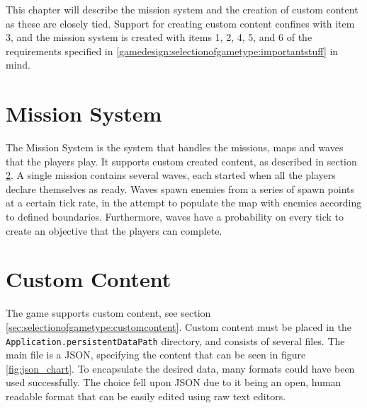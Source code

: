 This chapter will describe the mission system and the creation of custom content as these are closely tied.
Support for creating custom content confines with item 3, and the mission system is created with items 1, 2, 4, 5, and 6 of the requirements specified in \ref{gamedesign:selectionofgametype:importantstuff} in mind.

\section{Mission System}

The Mission System is the system that handles the missions, maps and waves that the players play.
It supports custom created content, as described in section \ref{sec:modules:missions:customcontent}.
A single mission contains several waves, each started when all the players declare themselves as ready.
Waves spawn enemies from a series of spawn points at a certain tick rate, in the attempt to populate the map with enemies according to defined boundaries.
Furthermore, waves have a probability on every tick to create an objective that the players can complete.

\section{Custom Content}\label{sec:modules:missions:customcontent}

The game supports custom content, see section \ref{sec:selectionofgametype:customcontent}.
Custom content must be placed in the \lstinline|Application.persistentDataPath| directory, and consists of several files.
The main file is a JSON, specifying the content that can be seen in figure \ref{fig:json_chart}.
To encapsulate the desired data, many formats could have been used successfully.
The choice fell upon JSON due to it being an open, human readable format that can be easily edited using raw text editors.

